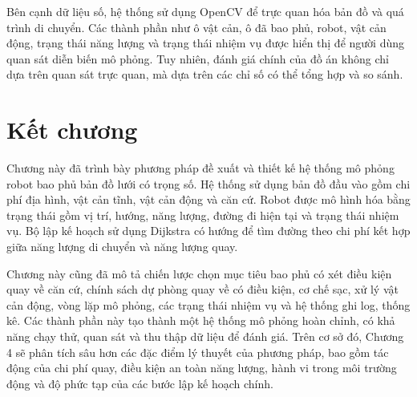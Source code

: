 \documentclass[../DoAn.tex]{subfiles}
\begin{document}
Bên cạnh dữ liệu số, hệ thống sử dụng OpenCV để trực quan hóa bản đồ và quá trình di chuyển. Các thành phần như ô vật cản, ô đã bao phủ, robot, vật cản động, trạng thái năng lượng và trạng thái nhiệm vụ được hiển thị để người dùng quan sát diễn biến mô phỏng. Tuy nhiên, đánh giá chính của đồ án không chỉ dựa trên quan sát trực quan, mà dựa trên các chỉ số có thể tổng hợp và so sánh.

\section{Kết chương}

Chương này đã trình bày phương pháp đề xuất và thiết kế hệ thống mô phỏng robot bao phủ bản đồ lưới có trọng số. Hệ thống sử dụng bản đồ đầu vào gồm chi phí địa hình, vật cản tĩnh, vật cản động và căn cứ. Robot được mô hình hóa bằng trạng thái gồm vị trí, hướng, năng lượng, đường đi hiện tại và trạng thái nhiệm vụ. Bộ lập kế hoạch sử dụng Dijkstra có hướng để tìm đường theo chi phí kết hợp giữa năng lượng di chuyển và năng lượng quay.

Chương này cũng đã mô tả chiến lược chọn mục tiêu bao phủ có xét điều kiện quay về căn cứ, chính sách dự phòng quay về có điều kiện, cơ chế sạc, xử lý vật cản động, vòng lặp mô phỏng, các trạng thái nhiệm vụ và hệ thống ghi log, thống kê. Các thành phần này tạo thành một hệ thống mô phỏng hoàn chỉnh, có khả năng chạy thử, quan sát và thu thập dữ liệu để đánh giá. Trên cơ sở đó, Chương 4 sẽ phân tích sâu hơn các đặc điểm lý thuyết của phương pháp, bao gồm tác động của chi phí quay, điều kiện an toàn năng lượng, hành vi trong môi trường động và độ phức tạp của các bước lập kế hoạch chính.
\end{document}
